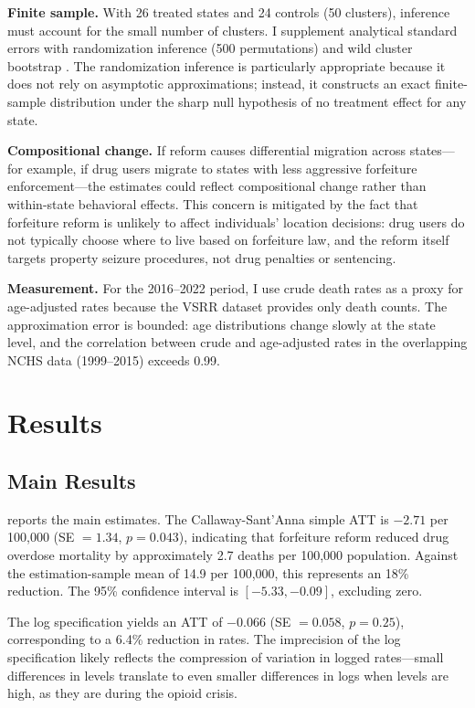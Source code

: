 \documentclass[12pt]{article}
\begin{document}
\textbf{Finite sample.} With 26 treated states and 24 controls (50 clusters), inference must account for the small number of clusters. I supplement analytical standard errors with randomization inference (500 permutations) and wild cluster bootstrap \citep{cameron2015practitioner}. The randomization inference is particularly appropriate because it does not rely on asymptotic approximations; instead, it constructs an exact finite-sample distribution under the sharp null hypothesis of no treatment effect for any state.

\textbf{Compositional change.} If reform causes differential migration across states---for example, if drug users migrate to states with less aggressive forfeiture enforcement---the estimates could reflect compositional change rather than within-state behavioral effects. This concern is mitigated by the fact that forfeiture reform is unlikely to affect individuals' location decisions: drug users do not typically choose where to live based on forfeiture law, and the reform itself targets property seizure procedures, not drug penalties or sentencing.

\textbf{Measurement.} For the 2016--2022 period, I use crude death rates as a proxy for age-adjusted rates because the VSRR dataset provides only death counts. The approximation error is bounded: age distributions change slowly at the state level, and the correlation between crude and age-adjusted rates in the overlapping NCHS data (1999--2015) exceeds 0.99.


\section{Results}
\label{sec:results}

\subsection{Main Results}

 reports the main estimates. The Callaway-Sant'Anna simple ATT is $-2.71$ per 100,000 (SE $= 1.34$, $p = 0.043$), indicating that forfeiture reform reduced drug overdose mortality by approximately 2.7 deaths per 100,000 population. Against the estimation-sample mean of 14.9 per 100,000, this represents an 18\% reduction. The 95\% confidence interval is $[-5.33, -0.09]$, excluding zero.

The log specification yields an ATT of $-0.066$ (SE $= 0.058$, $p = 0.25$), corresponding to a 6.4\% reduction in rates. The imprecision of the log specification likely reflects the compression of variation in logged rates---small differences in levels translate to even smaller differences in logs when levels are high, as they are during the opioid crisis.
\end{document}
